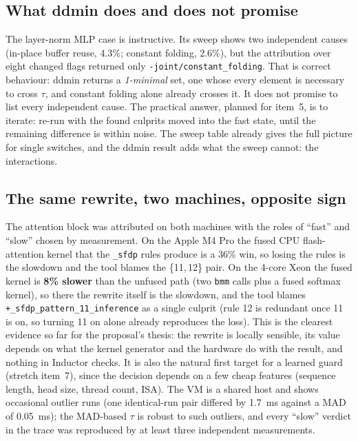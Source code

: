 \documentclass[11pt]{article}
\newcommand{\code}[1]{\texttt{#1}}
\begin{document}
\FloatBarrier
\subsection*{What ddmin does and does not promise}
The layer-norm MLP case is instructive. Its sweep shows two independent causes (in-place buffer
reuse, 4.3\%; constant folding, 2.6\%), but the attribution over eight changed flags returned
only \code{-joint/constant\_folding}. That is correct behaviour: ddmin returns a \emph{1-minimal}
set, one whose every element is necessary to cross $\tau$, and constant folding alone already
crosses it. It does not promise to list every independent cause. The practical answer, planned for
item~5, is to iterate: re-run with the found culprits moved into the fast state, until the
remaining difference is within noise. The sweep table already gives the full picture for
single switches, and the ddmin result adds what the sweep cannot: the interactions.

\subsection*{The same rewrite, two machines, opposite sign}
The attention block was attributed on both machines with the roles of ``fast'' and ``slow''
chosen by measurement. On the Apple M4 Pro the fused CPU flash-attention kernel that the
\code{\_sfdp} rules produce is a 36\% win, so losing the rules is the slowdown and the tool blames
the \{11,\,12\} pair. On the 4-core Xeon the fused kernel is \textbf{8\% slower} than the
unfused path (two \code{bmm} calls plus a fused softmax kernel), so there the rewrite itself is the
slowdown, and the tool blames \code{+\_sfdp\_pattern\_11\_inference} as a single culprit (rule 12 is
redundant once 11 is on, so turning 11 on alone already reproduces the loss). This is the
clearest evidence so far for the proposal's thesis: the rewrite is locally sensible, its value
depends on what the kernel generator and the hardware do with the result, and nothing in Inductor
checks. It is also the natural first target for a learned guard (stretch item~7), since the
decision depends on a few cheap features (sequence length, head size, thread count, ISA).
The VM is a shared host and shows occasional outlier runs (one identical-run pair differed by
1.7~ms against a MAD of 0.05~ms); the MAD-based $\tau$ is robust to such outliers, and every
``slow'' verdict in the trace was reproduced by at least three independent measurements.

\FloatBarrier
\end{document}
